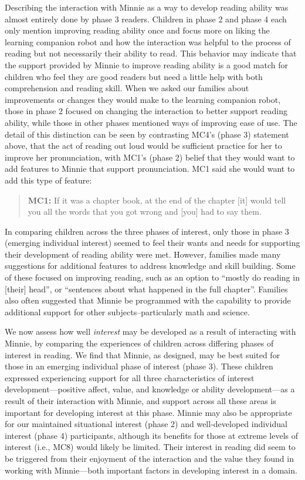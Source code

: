 \documentclass{sigchi}
\begin{document}
Describing the interaction with Minnie as a way to develop reading ability was almost entirely done by phase 3 readers. Children in phase 2 and phase 4 each only mention improving reading ability once and focus more on liking the learning companion robot and how the interaction was helpful to the process of reading but not necessarily their ability to read. This behavior may indicate that the support provided by Minnie to improve reading ability is a good match for children who feel they are good readers but need a little help with both comprehension and reading skill. When we asked our families about improvements or changes they would make to the learning companion robot, those in phase 2 focused on changing the interaction to better support reading ability, while those in other phases mentioned ways of improving ease of use. The detail of this distinction can be seen by contrasting MC4's (phase 3) statement above, that the act of reading out loud would be sufficient practice for her to improve her pronunciation, with MC1's (phase 2) belief that they would want to add features to Minnie that support pronunciation. MC1 said she would want to add this type of feature:
	 \begin{quote}
	 \textbf{MC1:} If it was a chapter book, at the end of the chapter [it] would tell you all the words that you got wrong and [you] had to say them.
	\end{quote}

In comparing children across the three phases of interest, only those in phase 3 (emerging individual interest) seemed to feel their wants and needs for supporting their development of reading ability were met. However, families made many suggestions for additional features to address knowledge and skill building. Some of these focused on improving reading, such as an option to ``mostly do reading in [their] head'', or ``sentences about what happened in the full chapter''. Families also often suggested that Minnie be programmed with the capability to provide additional support for other subjects--particularly math and science.

We now assess how well \textit{interest} may be developed as a result of interacting with Minnie, by comparing the experiences of children across differing phases of interest in reading. We find that Minnie, as designed, may be best suited for those in an emerging individual phase of interest (phase 3). These children expressed experiencing support for all three characteristics of interest development---positive affect, value, and knowledge or ability development---as a result of their interaction with Minnie, and support across all these areas is important for developing interest at this phase. Minnie may also be appropriate for our maintained situational interest (phase 2) and well-developed individual interest (phase 4) participants, although its benefits for those at extreme levels of interest (i.e., MC8) would likely be limited. Their interest in reading did seem to be triggered from their enjoyment of the interaction and the value they found in working with Minnie---both important factors in developing interest in a domain.
\end{document}
